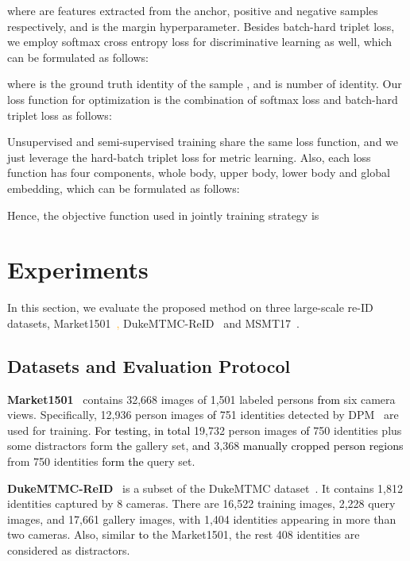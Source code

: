 \documentclass[10pt,twocolumn,letterpaper]{article}
\newcommand{\yq}{\textcolor{orange}}
\newcommand{\re}{\textcolor{black}}
\begin{document}
where  are features extracted from the anchor, positive and negative samples respectively, and  is the margin hyperparameter.
Besides batch-hard triplet loss, we employ softmax cross entropy loss for discriminative learning as well, which can be formulated as follows:

where  is the ground truth identity of the sample , and  is number of identity. Our loss function for optimization is the combination of softmax loss and batch-hard triplet loss as follows: 



Unsupervised and semi-supervised training share the same loss function, and we just leverage the hard-batch triplet loss for metric learning. Also, each loss function has four components, whole body, upper body, lower body and global embedding, which can be formulated as follows:

Hence, the objective function used in jointly training strategy is 

 \section{Experiments}
In this section, we evaluate the proposed method on three large-scale re-ID datasets, \ie Market1501~\cite{zheng2015scalable}\yq{,} DukeMTMC-ReID~\cite{ristani2016performance, zheng2017unlabeled} and MSMT17~\cite{wei2017person}. 

\subsection{Datasets and Evaluation Protocol}
{\bf Market1501}~\cite{zheng2015scalable} contains 32,668 images of 1,501 labeled persons \re{from} six camera views. Specifically, 12,936 person images \re{of} 751 identities detected by DPM~\cite{felzenszwalb2010object} are used for training. \re{For testing, in total} 19,732 person images \re{of} 750 identities plus some distractors form \re{the} gallery set, \re{and} 3,368 \re{manually cropped person regions} from 750 identities \re{form the} query set. 

{\bf DukeMTMC-ReID}~\cite{zheng2017unlabeled} is a subset of the DukeMTMC dataset~\cite{ristani2016performance}. It contains 1,812 identities captured by 8 cameras. There are 16,522 training images, 2,228 query images, and 17,661 gallery images, with 1,404 identities appearing in more than two cameras. Also, similar \re{to} the Market1501, the rest 408 identities are considered as distractors. 
\end{document}
